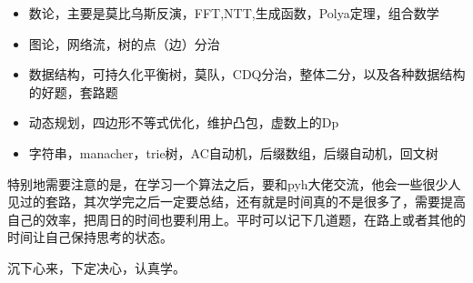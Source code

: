 \documentclass{ctexart}
\begin{document}
\begin{itemize}
\item 数论，主要是莫比乌斯反演，FFT,NTT,生成函数，Polya定理，组合数学
\item 图论，网络流，树的点（边）分治
\item 数据结构，可持久化平衡树，莫队，CDQ分治，整体二分，以及各种数据结构的好题，套路题
\item 动态规划，四边形不等式优化，维护凸包，虚数上的Dp
\item 字符串，manacher，trie树，AC自动机，后缀数组，后缀自动机，回文树
\end{itemize}

特别地需要注意的是，在学习一个算法之后，要和pyh大佬交流，他会一些很少人见过的套路，其次学完之后一定要总结，还有就是时间真的不是很多了，需要提高自己的效率，把周日的时间也要利用上。平时可以记下几道题，在路上或者其他的时间让自己保持思考的状态。

沉下心来，下定决心，认真学。

\newpage
\end{document}
